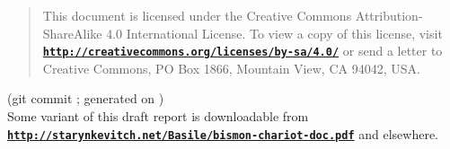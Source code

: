\documentclass[11pt,a4paper,svgnames]{article}
\newcommand{\bmurl}[1]{{\href{#1}{\texttt{\textbf{#1}}}}}
\begin{document}
\begin{quote}
{\footnotesize {} This document
is licensed under the Creative Commons Attribution-ShareAlike 4.0
International License. To view a copy of this license, visit
\bmurl{http://creativecommons.org/licenses/by-sa/4.0/} or send a letter to
Creative Commons, PO Box 1866, Mountain View, CA 94042, USA.}
\end{quote}

\begin{flushright}
  \begin{relsize}{-1}
    (git commit \texttt{\bmgitcommit}; generated on
    \textit{\bmdoctimestamp})\\
    Some variant of this draft report is
    downloadable from \bmurl{http://starynkevitch.net/Basile/bismon-chariot-doc.pdf} and
    elsewhere.
  \end{relsize}
\end{flushright}
\end{document}
